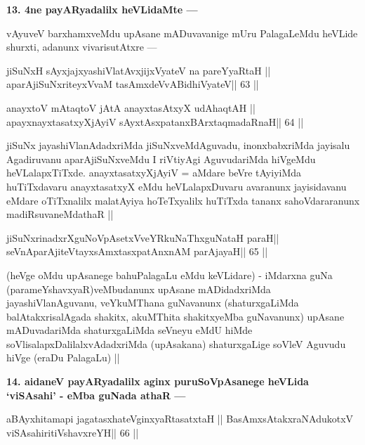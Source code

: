 \begin{artha}
{\bf 13. 4ne payARyadalilx heVLidaMte ---}
\end{artha}

\begin{artha}
vAyuveV barxhamxveMdu upAsane mADuvavanige mUru PalagaLeMdu heVLide shurxti, adanunx vivarisutAtxre ---
\end{artha}

\begin{shl}
jiSuNxH sAyxjajxyashiVlatAvxjijxVyateV na pareYyaRtaH ||
aparAjiSuNxriteyxVvaM tasAmxdeVvABidhiVyateV\hfill || 63 ||
\end{shl}

\begin{shl}
anayxtoV mAtaqtoV jAtA anayxtasAtxyX udAhaqtAH ||
apayxnayxtasatxyXjAyiV sAyxtAsxpatanxBArxtaqmadaRnaH\hfill || 64 ||
\end{shl}

\begin{artha}
jiSuNx jayashiVlanAdadxriMda jiSuNxveMdAguvadu, inonxbabxriMda jayisalu Agadiruvanu aparAjiSuNxveMdu I riVtiyAgi AguvudariMda hiVgeMdu heVLalapxTiTxde. anayxtasatxyXjAyiV = aMdare beVre tAyiyiMda huTiTxdavaru anayxtasatxyX eMdu heVLalapxDuvaru avaranunx jayisidavanu eMdare oTiTxnalilx malatAyiya hoTeTxyalilx huTiTxda tananx sahoVdararanunx madiRsuvaneMdathaR ||
\end{artha}

\begin{shl}
jiSuNxrinadxrXguNoVpAsetxVveYRkuNaThxguNataH paraH||
seVnA\s parAjiteVtayxsAmxtasxpatAnxnAM parAjayaH\hfill || 65 ||
\end{shl}

\begin{artha}
(heVge oMdu upAsanege bahuPalagaLu eMdu keVLidare) - iMdarxna guNa (parameYshavxyaR)veMbudanunx upAsane mADidadxriMda jayashiVlanAguvanu, veYkuMThana guNavanunx (shaturxgaLiMda balAtakxrisalAgada shakitx, akuMThita shakitxyeMba guNavanunx) upAsane mADuvadariMda shaturxgaLiMda seVneyu eMdU hiMde soVlisalapxDalilalxvAdadxriMda (upAsakana) shaturxgaLige soVleV Aguvudu hiVge (eraDu PalagaLu) ||
\end{artha}

\begin{artha}
{\bf 14. aidaneV payARyadalilx aginx puruSoVpAsanege heVLida `viSAsahi' - eMba guNada athaR ---}
\end{artha}

\begin{shl}
aBAyxhitamapi jagatasxhateV\s ginxyaRtasatxtaH ||
BasAmxsAtakxraNAdukotxV viSAsahiritiVshavxreYH\hfill || 66 ||
\end{shl}

